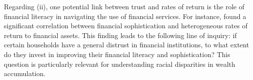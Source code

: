 \documentclass[\econtexRoot/PreproposalFinal]{subfiles}
\begin{document}
\par Regarding (ii), one potential link between trust and rates of return is the role of financial literacy in navigating the use of financial services. For instance, \cite{fddgri14} found a significant correlation between financial sophistication and heterogeneous rates of return to financial assets. This finding leads to the following line of inquiry: if certain households have a general distrust in financial institutions, to what extent do they invest in improving their financial literacy and sophistication? This question is particularly relevant for understanding racial disparities in wealth accumulation.




\onlyinsubfile{}

\end{document}
